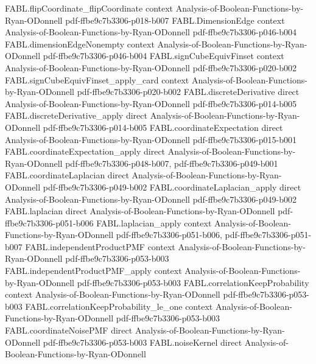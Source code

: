 \begin{theorem}
\proofstep
  {FABL.flipCoordinate_flipCoordinate}
  {context}
  {Analysis-of-Boolean-Functions-by-Ryan-ODonnell}
  {pdf-ffbe9c7b3306-p018-b007}
\proofstep
  {FABL.DimensionEdge}
  {context}
  {Analysis-of-Boolean-Functions-by-Ryan-ODonnell}
  {pdf-ffbe9c7b3306-p046-b004}
\proofstep
  {FABL.dimensionEdgeNonempty}
  {context}
  {Analysis-of-Boolean-Functions-by-Ryan-ODonnell}
  {pdf-ffbe9c7b3306-p046-b004}
\proofstep
  {FABL.signCubeEquivFinset}
  {context}
  {Analysis-of-Boolean-Functions-by-Ryan-ODonnell}
  {pdf-ffbe9c7b3306-p020-b002}
\proofstep
  {FABL.signCubeEquivFinset_apply_card}
  {context}
  {Analysis-of-Boolean-Functions-by-Ryan-ODonnell}
  {pdf-ffbe9c7b3306-p020-b002}
\proofstep
  {FABL.discreteDerivative}
  {direct}
  {Analysis-of-Boolean-Functions-by-Ryan-ODonnell}
  {pdf-ffbe9c7b3306-p014-b005}
\proofstep
  {FABL.discreteDerivative_apply}
  {direct}
  {Analysis-of-Boolean-Functions-by-Ryan-ODonnell}
  {pdf-ffbe9c7b3306-p014-b005}
\proofstep
  {FABL.coordinateExpectation}
  {direct}
  {Analysis-of-Boolean-Functions-by-Ryan-ODonnell}
  {pdf-ffbe9c7b3306-p015-b001}
\proofstep
  {FABL.coordinateExpectation_apply}
  {direct}
  {Analysis-of-Boolean-Functions-by-Ryan-ODonnell}
  {pdf-ffbe9c7b3306-p048-b007,
    pdf-ffbe9c7b3306-p049-b001}
\proofstep
  {FABL.coordinateLaplacian}
  {direct}
  {Analysis-of-Boolean-Functions-by-Ryan-ODonnell}
  {pdf-ffbe9c7b3306-p049-b002}
\proofstep
  {FABL.coordinateLaplacian_apply}
  {direct}
  {Analysis-of-Boolean-Functions-by-Ryan-ODonnell}
  {pdf-ffbe9c7b3306-p049-b002}
\proofstep
  {FABL.laplacian}
  {direct}
  {Analysis-of-Boolean-Functions-by-Ryan-ODonnell}
  {pdf-ffbe9c7b3306-p051-b006}
\proofstep
  {FABL.laplacian_apply}
  {context}
  {Analysis-of-Boolean-Functions-by-Ryan-ODonnell}
  {pdf-ffbe9c7b3306-p051-b006,
    pdf-ffbe9c7b3306-p051-b007}
\proofstep
  {FABL.independentProductPMF}
  {context}
  {Analysis-of-Boolean-Functions-by-Ryan-ODonnell}
  {pdf-ffbe9c7b3306-p053-b003}
\proofstep
  {FABL.independentProductPMF_apply}
  {context}
  {Analysis-of-Boolean-Functions-by-Ryan-ODonnell}
  {pdf-ffbe9c7b3306-p053-b003}
\proofstep
  {FABL.correlationKeepProbability}
  {context}
  {Analysis-of-Boolean-Functions-by-Ryan-ODonnell}
  {pdf-ffbe9c7b3306-p053-b003}
\proofstep
  {FABL.correlationKeepProbability_le_one}
  {context}
  {Analysis-of-Boolean-Functions-by-Ryan-ODonnell}
  {pdf-ffbe9c7b3306-p053-b003}
\proofstep
  {FABL.coordinateNoisePMF}
  {direct}
  {Analysis-of-Boolean-Functions-by-Ryan-ODonnell}
  {pdf-ffbe9c7b3306-p053-b003}
\proofstep
  {FABL.noiseKernel}
  {direct}
  {Analysis-of-Boolean-Functions-by-Ryan-ODonnell}

\end{theorem}
